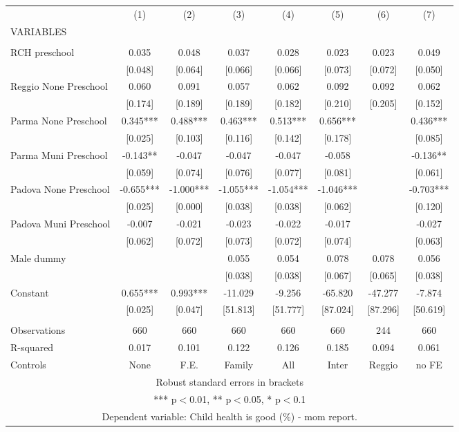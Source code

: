 \begin{tabular}{lccccccc} \hline
 & (1) & (2) & (3) & (4) & (5) & (6) & (7) \\
VARIABLES &  &  &  &  &  &  &  \\ \hline
 &  &  &  &  &  &  &  \\
RCH preschool & 0.035 & 0.048 & 0.037 & 0.028 & 0.023 & 0.023 & 0.049 \\
 & [0.048] & [0.064] & [0.066] & [0.066] & [0.073] & [0.072] & [0.050] \\
Reggio None Preschool & 0.060 & 0.091 & 0.057 & 0.062 & 0.092 & 0.092 & 0.062 \\
 & [0.174] & [0.189] & [0.189] & [0.182] & [0.210] & [0.205] & [0.152] \\
Parma None Preschool & 0.345*** & 0.488*** & 0.463*** & 0.513*** & 0.656*** &  & 0.436*** \\
 & [0.025] & [0.103] & [0.116] & [0.142] & [0.178] &  & [0.085] \\
Parma Muni Preschool & -0.143** & -0.047 & -0.047 & -0.047 & -0.058 &  & -0.136** \\
 & [0.059] & [0.074] & [0.076] & [0.077] & [0.081] &  & [0.061] \\
Padova None Preschool & -0.655*** & -1.000*** & -1.055*** & -1.054*** & -1.046*** &  & -0.703*** \\
 & [0.025] & [0.000] & [0.038] & [0.038] & [0.062] &  & [0.120] \\
Padova Muni Preschool & -0.007 & -0.021 & -0.023 & -0.022 & -0.017 &  & -0.027 \\
 & [0.062] & [0.072] & [0.073] & [0.072] & [0.074] &  & [0.063] \\
Male dummy &  &  & 0.055 & 0.054 & 0.078 & 0.078 & 0.056 \\
 &  &  & [0.038] & [0.038] & [0.067] & [0.065] & [0.038] \\
Constant & 0.655*** & 0.993*** & -11.029 & -9.256 & -65.820 & -47.277 & -7.874 \\
 & [0.025] & [0.047] & [51.813] & [51.777] & [87.024] & [87.296] & [50.619] \\
 &  &  &  &  &  &  &  \\
Observations & 660 & 660 & 660 & 660 & 660 & 244 & 660 \\
R-squared & 0.017 & 0.101 & 0.122 & 0.126 & 0.185 & 0.094 & 0.061 \\
 Controls & None & F.E. & Family & All & Inter & Reggio & no FE \\ \hline
\multicolumn{8}{c}{ Robust standard errors in brackets} \\
\multicolumn{8}{c}{ *** p$<$0.01, ** p$<$0.05, * p$<$0.1} \\
\multicolumn{8}{c}{ Dependent variable: Child health is good (\%) - mom report.} \\
\end{tabular}

